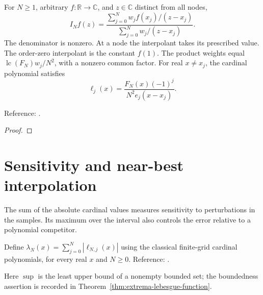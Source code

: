 \begin{theorem}
\label{thm:extrema-barycentric}
\leanok
For $N\ge1$, arbitrary $f:\mathbb R\to\mathbb C$, and $z\in\mathbb C$ distinct
from all nodes,
\[
 I_Nf(z)=\frac{\sum_{j=0}^N w_j f(x_j)/(z-x_j)}
                   {\sum_{j=0}^N w_j/(z-x_j)}.
\]
The denominator is nonzero. At a node the interpolant takes its prescribed value. The order-zero interpolant is the constant $f(1)$.
The product weights equal $\operatorname{lc}(F_N)w_j/N^2$, with a nonzero common
factor. For real $x\ne x_j$, the cardinal polynomial satisfies
\[
 \ell_j(x)=\frac{F_N(x)(-1)^j}{N^2 e_j(x-x_j)}.
\]

Reference: \cite[Theorem 5.2]{atap}.
\end{theorem}
\begin{proof}
\leanok
\end{proof}

\section{Sensitivity and near-best interpolation}\label{sec:textbook-interpolation-lebesgue}

The sum of the absolute cardinal values measures sensitivity to perturbations in the samples. Its maximum over the interval also controls the error relative to a polynomial competitor.

\begin{definition}
\label{def:extrema-lebesgue}
\leanok
Define $\lambda_N(x)=\sum_{j=0}^N|\ell_{N,j}(x)|$ using the classical
finite-grid cardinal polynomials, for every real $x$ and $N\ge0$.
Reference: \cite[Chapter 15]{atap}.
\end{definition}

Here $\sup$ is the least upper bound of a nonempty bounded set; the boundedness assertion is recorded in Theorem~\ref{thm:extrema-lebesgue-function}.

